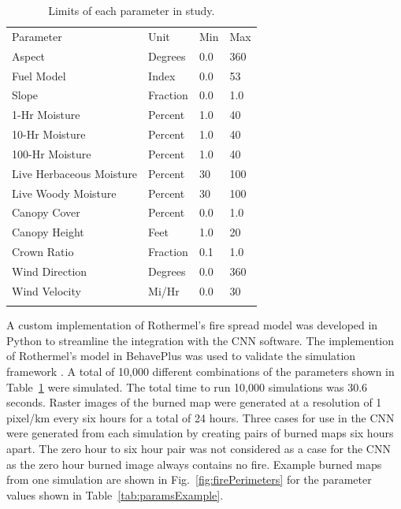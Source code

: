 \documentclass[smallcondensed]{svjour3}     %
\begin{document}
\begin{table}[htb]
\centering
\caption{Limits of each parameter in study.}
\label{tab:paramsLimits}       %
\begin{tabular}{llll}
\hline\noalign{\smallskip}
Parameter & Unit & Min & Max  \\
\noalign{\smallskip}\hline\noalign{\smallskip}
Aspect & Degrees & 0.0 & 360 \\
Fuel Model & Index & 0.0 & 53 \\
Slope & Fraction & 0.0 & 1.0 \\
\hline
1-Hr Moisture & Percent & 1.0 & 40 \\
10-Hr Moisture & Percent & 1.0 & 40 \\
100-Hr Moisture & Percent & 1.0 & 40 \\
Live Herbaceous Moisture & Percent & 30 & 100 \\
Live Woody Moisture & Percent & 30 & 100 \\
\hline
Canopy Cover & Percent & 0.0 & 1.0 \\
Canopy Height & Feet & 1.0 & 20 \\
Crown Ratio & Fraction & 0.1 & 1.0 \\
\hline
Wind Direction & Degrees & 0.0 & 360 \\
Wind Velocity & Mi/Hr & 0.0 & 30 \\
\noalign{\smallskip}\hline
\end{tabular}
\end{table}

A custom implementation of Rothermel's fire spread model was developed
in Python to streamline the integration with the CNN software.
The implemention of Rothermel's model in BehavePlus was used to validate
the simulation framework \cite{andrews2009behaveplus}. A total of
10,000 different combinations of the parameters shown in Table~\ref{tab:paramsLimits}
were simulated. The total time to run 10,000 simulations was 30.6 seconds.
Raster images of the burned map were generated at a resolution of
1 pixel/km every six hours for a total of 24 hours.
Three cases for use in the CNN were generated from each simulation
by creating pairs of burned maps six hours apart. The zero hour to six hour
pair was not considered as a case for the CNN as the zero hour burned image
always contains no fire.
Example burned maps from one simulation are shown in
Fig.~\ref{fig:firePerimeters} for the parameter values
shown in Table~\ref{tab:paramsExample}.
\end{document}
